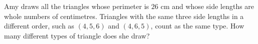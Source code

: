 Amy draws all the triangles whose perimeter is $26$ cm and whose side lengths are whole numbers of centimetres. Triangles with the same three side lengths in a different order, such as $(4,5,6)$ and $(4,6,5)$, count as the same type. How many different types of triangle does she draw?
